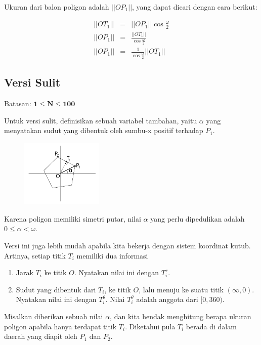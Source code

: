 \documentclass[../main_editorial.tex]{subfiles} %
\begin{document}
Ukuran dari balon poligon adalah $||OP_1||$, yang dapat dicari dengan cara berikut:

\begin{eqnarray*}
||OT_1|| &=& ||OP_1|| \cos{\frac{\omega}{2}} \\
||OP_1|| &=& \frac{||OT_1||}{\cos{\frac{\omega}{2}}} \\
||OP_1|| &=& \frac{1}{\cos{\frac{\omega}{2}}} ||OT_1||
\end{eqnarray*}

\subsection*{Versi Sulit}

Batasan: $\mathbf{1 \le N \le 100}$

Untuk versi sulit, definisikan sebuah variabel tambahan, yaitu $\alpha$ yang menyatakan sudut yang dibentuk oleh sumbu-x positif terhadap $P_1$.

\begin{figure}[H]\centering
	\centering
	\includegraphics[width=0.35\textwidth]{balon/asset/hard-intro.pdf}
\end{figure}

Karena poligon memiliki simetri putar, nilai $\alpha$ yang perlu dipedulikan adalah $0 \le \alpha < \omega$. 

Versi ini juga lebih mudah apabila kita bekerja dengan sistem koordinat kutub. Artinya, setiap titik $T_i$ memiliki dua informasi

\begin{enumerate}
  \item Jarak $T_i$ ke titik $O$. Nyatakan nilai ini dengan $T_i^r$.
  \item Sudut yang dibentuk dari $T_i$, ke titik $O$, lalu menuju ke suatu titik $(\infty, 0)$. Nyatakan nilai ini dengan $T_i^\theta$. Nilai $T_i^\theta$ adalah anggota dari $[0, 360)$.
\end{enumerate}

Misalkan diberikan sebuah nilai $\alpha$, dan kita hendak menghitung berapa ukuran poligon apabila hanya terdapat titik $T_i$. Diketahui pula $T_i$ berada di dalam daerah yang diapit oleh $P_1$ dan $P_2$. 
\end{document}
